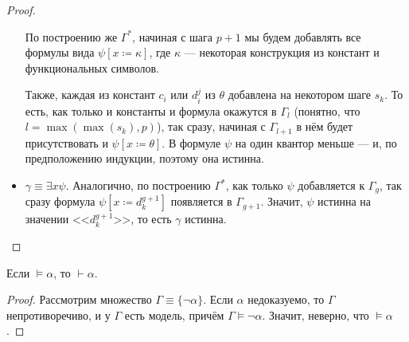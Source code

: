 \begin{proof}
\begin{itemize}
По построению же $\Gamma^*$, начиная с шага $p+1$
мы будем добавлять все формулы вида $\psi [x \coloneqq  \kappa]$, где $\kappa$ ---
некоторая конструкция из констант и функциональных символов.

Также, каждая из констант $c_i$ или $d_i^j$ из $\theta$ добавлена на некотором 
шаге $s_k$. То есть, как только и константы и формула окажутся в $\Gamma_l$
(понятно, что $l = \max(\max(s_k),p)$), так сразу, начиная с $\Gamma_{l+1}$ 
в нём будет присутствовать и $\psi [x \coloneqq  \theta]$. В формуле $\psi$ 
на один квантор меньше --- и, по предположению индукции, поэтому она истинна.

\item $\gamma \equiv \exists x \psi$.
Аналогично, по построению $\Gamma^*$, как только $\psi$ добавляется к $\Gamma_g$,
так сразу формула $\psi[x \coloneqq  d_k^{g+1}]$ появляется в $\Gamma_{g+1}$.
Значит, $\psi$ истинна на значении $\texttt{<<}d_k^{g+1}\texttt{>>}$,
то есть $\gamma$ истинна.
\end{itemize}
\end{proof}

\begin{theorem}
Если $\models \alpha$, то $\vdash \alpha$.
\end{theorem}
\begin{proof}
Рассмотрим множество $\Gamma \equiv \{\neg\alpha\}$. Если $\alpha$ недоказуемо, то 
$\Gamma$ непротиворечиво, и у $\Gamma$ есть модель, причём $\Gamma \models \neg\alpha$.
Значит, неверно, что $\models \alpha$.
\end{proof}
